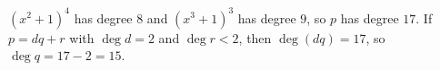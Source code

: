 $\left(x^2+1\right)^4$ has degree $8$ and $\left(x^3+1\right)^3$ has degree $9$, so $p$ has degree $17$. If $p=dq+r$ with $\deg d=2$ and $\deg r<2$, then $\deg(dq)=17$, so $\deg q=17-2=\boxed{15}$.

